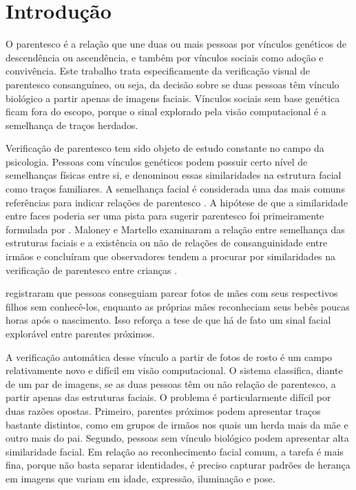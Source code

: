 \chapter[Introdução]{Introdução}
\label{cap:introducao}

O parentesco é a relação que une duas ou mais pessoas por vínculos genéticos de descendência ou ascendência, e também por vínculos sociais como adoção e convivência. Este trabalho trata especificamente da verificação visual de parentesco consanguíneo, ou seja, da decisão sobre se duas pessoas têm vínculo biológico a partir apenas de imagens faciais. Vínculos sociais sem base genética ficam fora do escopo, porque o sinal explorado pela visão computacional é a semelhança de traços herdados.

Verificação de parentesco tem sido objeto de estudo constante no campo da psicologia. Pessoas com vínculos genéticos podem possuir certo nível de semelhanças físicas entre si, e  denominou essas similaridades na estrutura facial como traços familiares. A semelhança facial é considerada uma das mais comuns referências para indicar relações de parentesco \cite{debruine2008social}. A hipótese de que a similaridade entre faces poderia ser uma pista para sugerir parentesco foi primeiramente formulada por . Maloney e Martello examinaram a relação entre semelhança das estruturas faciais e a existência ou não de relações de consanguinidade entre irmãos e concluíram que observadores tendem a procurar por similaridades na verificação de parentesco entre crianças \cite{maloney2006kin}.

 registraram que pessoas conseguiam parear fotos de mães com seus respectivos filhos sem conhecê-los, enquanto as próprias mães reconheciam seus bebês poucas horas após o nascimento. Isso reforça a tese de que há de fato um sinal facial explorável entre parentes próximos.

A verificação automática desse vínculo a partir de fotos de rosto é um campo relativamente novo e difícil em visão computacional. O sistema classifica, diante de um par de imagens, se as duas pessoas têm ou não relação de parentesco, a partir apenas das estruturas faciais. O problema é particularmente difícil por duas razões opostas. Primeiro, parentes próximos podem apresentar traços bastante distintos, como em grupos de irmãos nos quais um herda mais da mãe e outro mais do pai. Segundo, pessoas sem vínculo biológico podem apresentar alta similaridade facial. Em relação ao reconhecimento facial comum, a tarefa é mais fina, porque não basta separar identidades, é preciso capturar padrões de herança em imagens que variam em idade, expressão, iluminação e pose.

